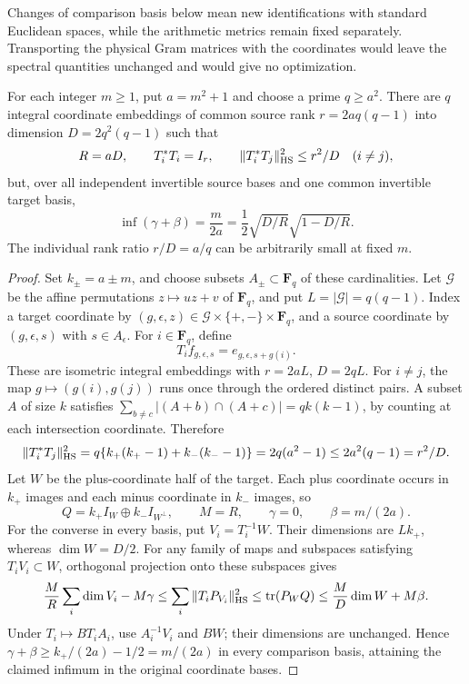 Changes of comparison basis below mean new identifications with standard
Euclidean spaces, while the arithmetic metrics remain fixed separately.
Transporting the physical Gram matrices with the coordinates would leave
the spectral quantities unchanged and would give no optimization.

\begin{proposition}
\label{shared-period-invariant-sharpness}
\label{shared-period-chirp}
\label{shared-period-simplex}
For each integer $m\ge1$, put $a=m^2+1$ and choose a prime $q\ge a^2$.
There are $q$ integral coordinate embeddings of common source rank
$r=2aq(q-1)$ into dimension $D=2q^2(q-1)$ such that
\[
 R=aD,\qquad T_i^*T_i=I_r,\qquad
 \|T_i^*T_j\|_{\rm HS}^2\le r^2/D\quad(i\ne j),
\]
but, over all independent invertible source bases and one common
invertible target basis,
\[
 \inf(\gamma+\beta)=\frac{m}{2a}
       =\frac12\sqrt{D/R}\sqrt{1-D/R}.
\]
The individual rank ratio $r/D=a/q$ can be arbitrarily small at fixed $m$.
\end{proposition}

\begin{proof}
Set $k_\pm=a\pm m$, and choose subsets $A_\pm\subset\mathbf F_q$ of
these cardinalities. Let $\mathcal G$ be the affine permutations
$z\mapsto uz+v$ of $\mathbf F_q$, and put $L=|\mathcal G|=q(q-1)$.
Index a target coordinate by $(g,\epsilon,z)\in
\mathcal G\times\{+,-\}\times\mathbf F_q$, and a source coordinate
by $(g,\epsilon,s)$ with $s\in A_\epsilon$. For $i\in\mathbf F_q$, define
\[
 T_i f_{g,\epsilon,s}=e_{g,\epsilon,s+g(i)}.
\]
These are isometric integral embeddings with $r=2aL$, $D=2qL$.
For $i\ne j$, the map $g\mapsto(g(i),g(j))$ runs once through the
ordered distinct pairs. A subset $A$ of size $k$ satisfies
$\sum_{b\ne c}|(A+b)\cap(A+c)|=qk(k-1)$, by counting at each
intersection coordinate. Therefore
\[
 \|T_i^*T_j\|_{\rm HS}^2
 =q\{k_+(k_+-1)+k_-(k_--1)\}=2q(a^2-1)
 \le2a^2(q-1)=r^2/D.
\]
Let $W$ be the plus-coordinate half of the target. Each plus coordinate
occurs in $k_+$ images and each minus coordinate in $k_-$ images, so
\[
 Q=k_+I_W\oplus k_-I_{W^\perp},\qquad M=R,\qquad
 \gamma=0,\qquad\beta=m/(2a).
\]
For the converse in every basis, put $V_i=T_i^{-1}W$.
Their dimensions are $Lk_+$, whereas $\dim W=D/2$.
For any family of maps and subspaces satisfying $T_iV_i\subset W$,
orthogonal projection onto these subspaces gives
\[
 \frac MR\sum_i\dim V_i-M\gamma
 \le\sum_i\|T_iP_{V_i}\|_{\rm HS}^2
 \le\operatorname{tr}(P_WQ)
 \le\frac MD\dim W+M\beta.
\]
Under $T_i\mapsto BT_iA_i$, use $A_i^{-1}V_i$ and $BW$; their
dimensions are unchanged. Hence $\gamma+\beta\ge
k_+/(2a)-1/2=m/(2a)$ in every comparison basis, attaining the claimed
infimum in the original coordinate bases.
\end{proof}

